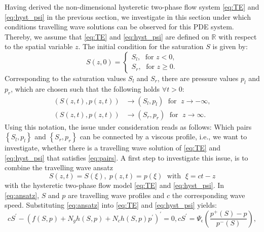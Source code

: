 \documentclass[smallextended]{svjour3}       %
\begin{document}
Having derived the non-dimensional hysteretic two-phase flow system \eqref{eq:TE} and \eqref{eq:hyst_psi} in the previous section, we investigate in this section under 
which conditions travelling wave solutions can be observed for this PDE system. Thereby, we assume that \eqref{eq:TE} and \eqref{eq:hyst_psi} are defined on $\mathbb{R}$
with respect to the spatial variable $z$. The initial condition for the saturation $S$ is given by: 
$$
S \left(z,0 \right) = 
\begin{cases}
S_l,\;\text{ for } z < 0, \\
S_r,\;\text{ for } z \geq 0.
\end{cases}
$$
Corresponding to the saturation values $S_l$ and $S_r$, there are pressure values $p_l$ and $p_r$, which are chosen such that the following holds $\forall t>0$:
\begin{align}
\label{eq:pairs}
\left( S\left(z,t \right), p\left(z,t\right) \right) &\rightarrow \left(S_l,p_l \right)\;  \text{ for } \; z \rightarrow -\infty, \\
\nonumber
\left( S\left(z,t \right), p\left(z,t\right) \right) &\rightarrow \left(S_r,p_r \right)\; \text{ for } \; z \rightarrow  \infty.
\end{align}
Using this notation, the issue under consideration reads as follows: Which pairs $\left\{S_l,p_l \right\}$ and $\left\{S_r,p_r \right\}$ can  be connected by a viscous profile, i.e., we want to investigate,
whether there is a travelling wave solution of \eqref{eq:TE} and \eqref{eq:hyst_psi} that satisfies \eqref{eq:pairs}. A first step to investigate this issue, is to combine the travelling wave ansatz
\begin{equation}
\label{eq:ansatz}
S\left(z,t \right) = S\left( \xi \right),\; p\left(z,t \right) = p\left( \xi \right)\;\text{ with }\;\xi = ct-z
\end{equation}
with the hysteretic two-phase flow model \eqref{eq:TE} and \eqref{eq:hyst_psi}. In \eqref{eq:ansatz}, $S$ and $p$ are travelling wave profiles and $c$ the corresponding wave speed. Substituting
\eqref{eq:ansatz} into \eqref{eq:TE} and \eqref{eq:hyst_psi} yields:
\begin{subequations}
\begin{equation}
\label{eq:ODES1}
cS^\prime - \left(  f\left(S,p \right) + N_g h\left(S,p \right) + N_c h\left(S,p \right)p^\prime \right)^\prime = 0, 
\end{equation}
\begin{equation}
\label{eq:ODES2}
cS^\prime =  \Psi_\epsilon \left( \frac{p^+\left( S \right) -p}{p^-\left( S \right)} \right), 
\end{equation}
\end{subequations}
\end{document}
